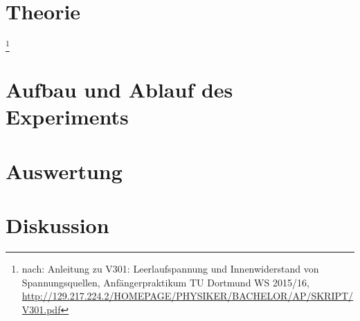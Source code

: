 \documentclass[a4,12pt]{article}
\begin{document}



\tableofcontents
\ \\
[3cm]

\clearpage

\section{Theorie}
\footnote{nach: Anleitung zu V301: Leerlaufspannung und Innenwiderstand von Spannungsquellen, Anfängerpraktikum TU Dortmund WS 2015/16, \url{http://129.217.224.2/HOMEPAGE/PHYSIKER/BACHELOR/AP/SKRIPT/V301.pdf}}

\newpage


\section{Aufbau und Ablauf des Experiments}

\clearpage

%
%

\section{Auswertung}

\clearpage


\section{Diskussion}

%
%
\end{document}
